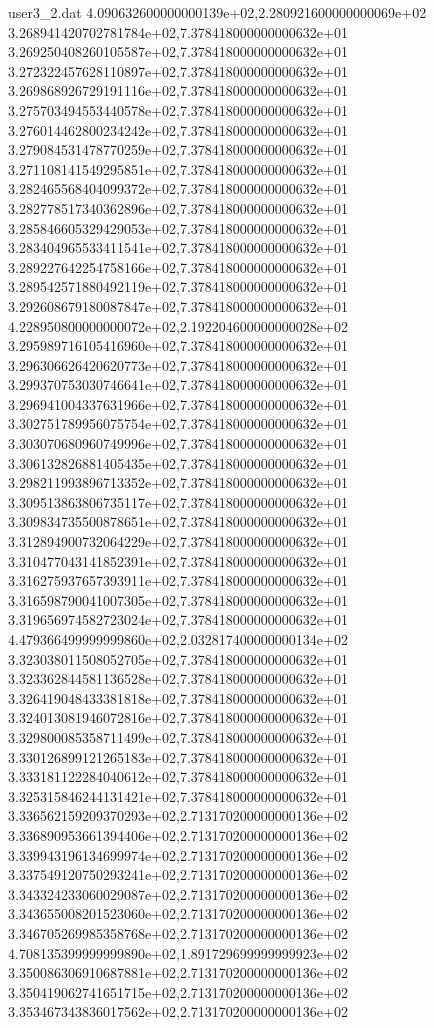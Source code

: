 \begin{filecontents}{user3_2.dat}
4.090632600000000139e+02,2.280921600000000069e+02
3.268941420702781784e+02,7.378418000000000632e+01
3.269250408260105587e+02,7.378418000000000632e+01
3.272322457628110897e+02,7.378418000000000632e+01
3.269868926729191116e+02,7.378418000000000632e+01
3.275703494553440578e+02,7.378418000000000632e+01
3.276014462800234242e+02,7.378418000000000632e+01
3.279084531478770259e+02,7.378418000000000632e+01
3.271108141549295851e+02,7.378418000000000632e+01
3.282465568404099372e+02,7.378418000000000632e+01
3.282778517340362896e+02,7.378418000000000632e+01
3.285846605329429053e+02,7.378418000000000632e+01
3.283404965533411541e+02,7.378418000000000632e+01
3.289227642254758166e+02,7.378418000000000632e+01
3.289542571880492119e+02,7.378418000000000632e+01
3.292608679180087847e+02,7.378418000000000632e+01
4.228950800000000072e+02,2.192204600000000028e+02
3.295989716105416960e+02,7.378418000000000632e+01
3.296306626420620773e+02,7.378418000000000632e+01
3.299370753030746641e+02,7.378418000000000632e+01
3.296941004337631966e+02,7.378418000000000632e+01
3.302751789956075754e+02,7.378418000000000632e+01
3.303070680960749996e+02,7.378418000000000632e+01
3.306132826881405435e+02,7.378418000000000632e+01
3.298211993896713352e+02,7.378418000000000632e+01
3.309513863806735117e+02,7.378418000000000632e+01
3.309834735500878651e+02,7.378418000000000632e+01
3.312894900732064229e+02,7.378418000000000632e+01
3.310477043141852391e+02,7.378418000000000632e+01
3.316275937657393911e+02,7.378418000000000632e+01
3.316598790041007305e+02,7.378418000000000632e+01
3.319656974582723024e+02,7.378418000000000632e+01
4.479366499999999860e+02,2.032817400000000134e+02
3.323038011508052705e+02,7.378418000000000632e+01
3.323362844581136528e+02,7.378418000000000632e+01
3.326419048433381818e+02,7.378418000000000632e+01
3.324013081946072816e+02,7.378418000000000632e+01
3.329800085358711499e+02,7.378418000000000632e+01
3.330126899121265183e+02,7.378418000000000632e+01
3.333181122284040612e+02,7.378418000000000632e+01
3.325315846244131421e+02,7.378418000000000632e+01
3.336562159209370293e+02,2.713170200000000136e+02
3.336890953661394406e+02,2.713170200000000136e+02
3.339943196134699974e+02,2.713170200000000136e+02
3.337549120750293241e+02,2.713170200000000136e+02
3.343324233060029087e+02,2.713170200000000136e+02
3.343655008201523060e+02,2.713170200000000136e+02
3.346705269985358768e+02,2.713170200000000136e+02
4.708135399999999890e+02,1.891729699999999923e+02
3.350086306910687881e+02,2.713170200000000136e+02
3.350419062741651715e+02,2.713170200000000136e+02
3.353467343836017562e+02,2.713170200000000136e+02

\end{filecontents}

